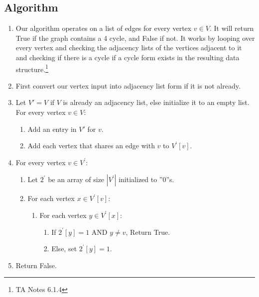 \documentclass{article}
\begin{document}
\subsection{Algorithm}
\begin{enumerate}
      \item Our algorithm operates on a list of edges for every vertex \(v \in V\). It will return
            True if the graph contains a 4 cycle, and False if not. It works by looping
            over every vertex and checking the adjacency lists of the vertices adjacent to
            it and checking if there is a cycle if a cycle form exists in the resulting
            data structure.\footnote{TA Notes 6.1.4}
      \item First convert our vertex input into adjacency list form if it is not already.
      \item Let \(V' = V\) if \(V\) is already an adjacency list, else initialize it to an
            empty list. For every vertex \(v \in V\): \begin{enumerate}
                  \item Add an entry in \(V'\) for \(v\).
                  \item Add each vertex that shares an edge with \(v\) to \(V^{\prime}[v]\).
            \end{enumerate}

      \item For every vertex \(v \in V^{\prime}\): \begin{enumerate}
                  \item Let \(2^\prime \) be an array of size \(|V^{\prime}| \)
                        initialized to ''0''s.
                  \item For each vertex \(x \in V^{\prime}[v]\): \begin{enumerate}
                              \item For each vertex \(y \in V^{\prime}[x]\): \begin{enumerate}
                                          \item If \(2^\prime [y] = 1\) AND \(y \neq v\), Return True.
                                          \item Else,  set \(2^\prime [y] = 1\).
                                    \end{enumerate}
                        \end{enumerate}
            \end{enumerate}
      \item Return False.
\end{enumerate}
\end{document}
